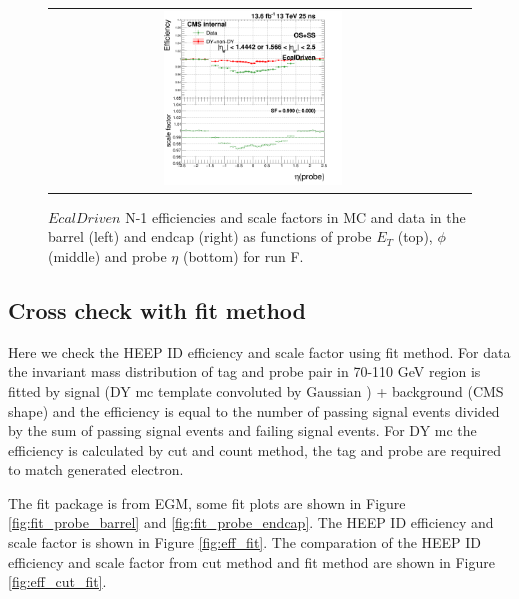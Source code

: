 \begin{figure}[bh]
\begin{center}
\begin{tabular}{cc}
      \includegraphics[width=0.45\textwidth]{figures/Zprime/2017/ScaleFactor/SameSign/RunF/N-1/g_compare_cut_eta_Barrel+Endcap_ea_ta_inc_AS_N_1_EcalDriven_PUW_F.png}
    \end{tabular}
    \caption{$EcalDriven$ N-1 efficiencies and scale factors in MC and data in the barrel (left) and endcap (right) as functions of probe $E_T$ (top), $\phi$ (middle) and probe $\eta$ (bottom) for run F.}
    \label{fig:EcalDriven_runF_2017}
  \end{center}
\end{figure}


\subsection{Cross check with fit method}
\label{AppHEEPsf_Fit_2017}
Here we check the HEEP ID efficiency and scale factor using fit method. For data the invariant mass distribution of tag and probe pair in 70-110 GeV region is fitted by signal (DY mc template convoluted by Gaussian ) + background (CMS shape) and the efficiency is equal to the number of passing signal events divided by the sum of passing signal events and failing signal events. For DY mc the efficiency is calculated by cut and count method, the tag and probe are required to match generated electron.

The fit package is from EGM, some fit plots are shown in Figure \ref{fig:fit_probe_barrel} and \ref{fig:fit_probe_endcap}.  The HEEP ID efficiency and scale factor is shown in Figure \ref{fig:eff_fit}.  The comparation of the HEEP ID efficiency and scale factor from cut method and fit method are shown in Figure \ref{fig:eff_cut_fit}.


